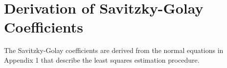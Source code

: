 \chapter{Derivation of Savitzky-Golay Coefficients}

The Savitzky-Golay coefficients are derived from the normal equations in Appendix 1 that describe the least squares estimation procedure.
